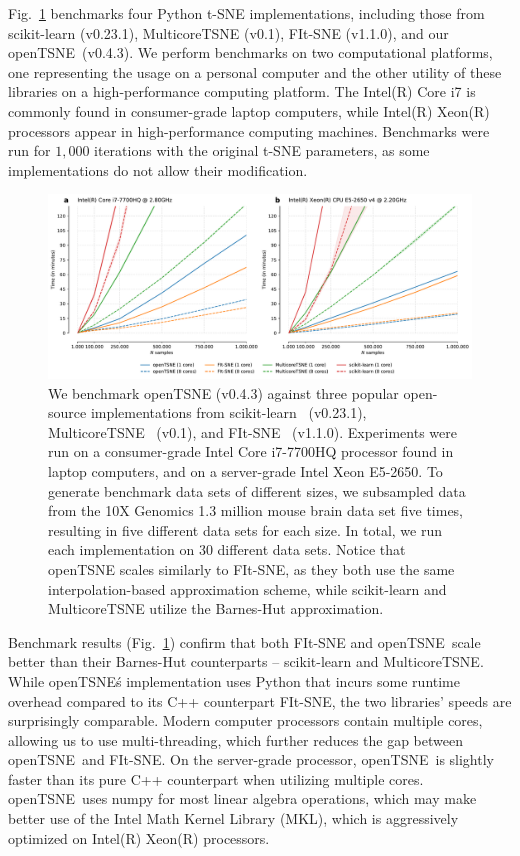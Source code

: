 \documentclass[twocolumn]{bmcart}
\newcommand{\opentsne}{\textsf{openTSNE}}
\begin{document}
Fig.~\ref{fig:benchmarks} benchmarks four Python t-SNE implementations,
including those from \textsf{scikit-learn} (v0.23.1), \textsf{MulticoreTSNE}
(v0.1), \textsf{FIt-SNE} (v1.1.0), and our \opentsne\ (v0.4.3). We perform
benchmarks on two computational platforms, one representing the usage on a
personal computer and the other utility of these libraries on a high-performance
computing platform. The Intel(R) Core i7 is commonly found in consumer-grade
laptop computers, while Intel(R) Xeon(R) processors appear in high-performance
computing machines. Benchmarks were run for $1,000$ iterations with the original
t-SNE parameters, as some implementations do not allow their modification. 

\begin{figure}[htbp]
  \includegraphics[width=\textwidth]{benchmarks}
  \caption{\label{fig:benchmarks}
We benchmark openTSNE (v0.4.3) against three popular open-source implementations
	from scikit-learn~\cite{pedregosa2011scikit} (v0.23.1),
	MulticoreTSNE~\cite{Ulyanov2016} (v0.1), and
	FIt-SNE~\cite{linderman2019fast} (v1.1.0). Experiments were run on a
	consumer-grade Intel Core i7-7700HQ processor found in laptop computers,
	and on a server-grade Intel Xeon E5-2650. To generate benchmark data
	sets of different sizes, we subsampled data from the 10X Genomics 1.3
	million mouse brain data set five times, resulting in five different
	data sets for each size. In total, we run each implementation on 30
	different data sets. Notice that openTSNE scales similarly to FIt-SNE,
	as they both use the same interpolation-based approximation scheme,
	while scikit-learn and MulticoreTSNE utilize the Barnes-Hut
	approximation.
}
\end{figure}

Benchmark results (Fig.~\ref{fig:benchmarks}) confirm that both \textsf{FIt-SNE}
and \opentsne\ scale better than their Barnes-Hut counterparts --
\textsf{scikit-learn} and \textsf{MulticoreTSNE}. While \opentsne\'s
implementation uses Python that incurs some runtime overhead compared to its C++
counterpart \textsf{FIt-SNE}, the two libraries' speeds are surprisingly
comparable. Modern computer processors contain multiple cores, allowing us to
use multi-threading, which further reduces the gap between \opentsne\ and
\textsf{FIt-SNE}. On the server-grade processor, \opentsne\ is slightly faster
than its pure C++ counterpart when utilizing multiple cores. \opentsne\ uses
\textsf{numpy} for most linear algebra operations, which may make better use of
the Intel Math Kernel Library (MKL), which is aggressively optimized on Intel(R)
Xeon(R) processors.  
\end{document}
